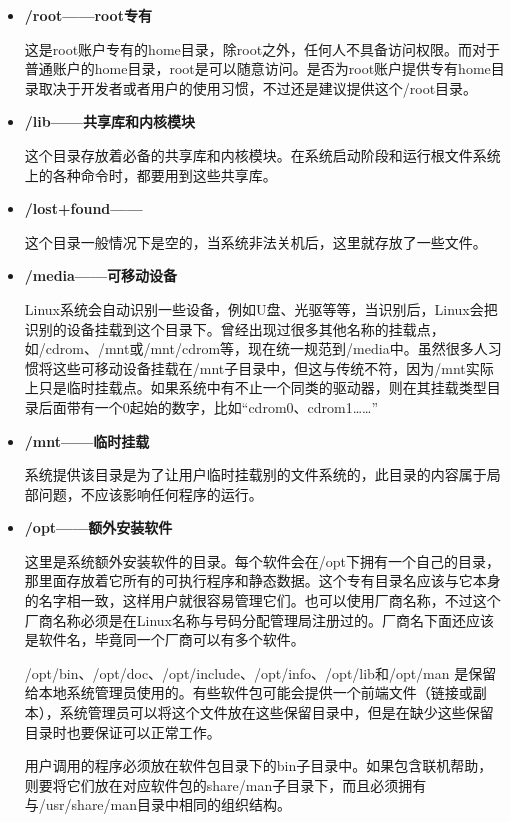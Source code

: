 \begin{itemize}
\item \textbf{/root——root专有}

\qquad 这是root账户专有的home目录，除root之外，任何人不具备访问权限。而对于普通账户的home目录，root是可以随意访问。是否为root账户提供专有home目录取决于开发者或者用户的使用习惯，不过还是建议提供这个/root目录。

\item \textbf{/lib——共享库和内核模块}

\qquad 这个目录存放着必备的共享库和内核模块。在系统启动阶段和运行根文件系统上的各种命令时，都要用到这些共享库。

\item \textbf{/lost+found——}

\qquad 这个目录一般情况下是空的，当系统非法关机后，这里就存放了一些文件。

\item \textbf{/media——可移动设备}

\qquad Linux系统会自动识别一些设备，例如U盘、光驱等等，当识别后，Linux会把识别的设备挂载到这个目录下。曾经出现过很多其他名称的挂载点，如/cdrom、/mnt或/mnt/cdrom等，现在统一规范到/media中。虽然很多人习惯将这些可移动设备挂载在/mnt子目录中，但这与传统不符，因为/mnt实际上只是临时挂载点。如果系统中有不止一个同类的驱动器，则在其挂载类型目录后面带有一个0起始的数字，比如“cdrom0、cdrom1……”

\item \textbf{/mnt——临时挂载}

\qquad 系统提供该目录是为了让用户临时挂载别的文件系统的，此目录的内容属于局部问题，不应该影响任何程序的运行。

\item \textbf{/opt——额外安装软件}

\qquad 这里是系统额外安装软件的目录。每个软件会在/opt下拥有一个自己的目录，那里面存放着它所有的可执行程序和静态数据。这个专有目录名应该与它本身的名字相一致，这样用户就很容易管理它们。也可以使用厂商名称，不过这个厂商名称必须是在Linux名称与号码分配管理局注册过的。厂商名下面还应该是软件名，毕竟同一个厂商可以有多个软件。

\qquad /opt/bin、/opt/doc、/opt/include、/opt/info、/opt/lib和/opt/man 是保留给本地系统管理员使用的。有些软件包可能会提供一个前端文件（链接或副本），系统管理员可以将这个文件放在这些保留目录中，但是在缺少这些保留目录时也要保证可以正常工作。

\qquad 用户调用的程序必须放在软件包目录下的bin子目录中。如果包含联机帮助，则要将它们放在对应软件包的share/man子目录下，而且必须拥有与/usr/share/man目录中相同的组织结构。


\end{itemize}
